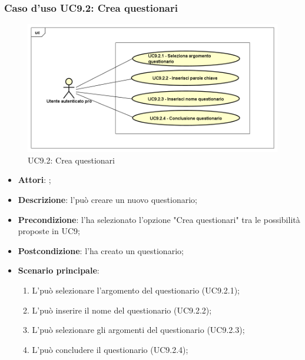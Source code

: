 	\subsubsection{Caso d'uso UC9.2: Crea questionari}
	\label{UC9.2}
	\begin{figure}[h]
		\centering
	\includegraphics[scale=0.5,keepaspectratio]{UML/UC9_2.png}
		\caption{UC9.2: Crea questionari}
	\end{figure}
	\FloatBarrier
	\begin{itemize}
		\item \textbf{Attori}: \uaupro;
		\item \textbf{Descrizione}: l'\uaupro può creare un nuovo questionario; 
		\item \textbf{Precondizione}: l'\uaupro ha selezionato l'opzione "Crea questionari" tra le possibilità proposte in UC9;
		\item \textbf{Postcondizione}: l'\uaupro ha creato un questionario;
		\item \textbf{Scenario principale}:
			\begin{enumerate}
				\item L'\uaupro può selezionare l'argomento del questionario (UC9.2.1);
				\item L'\uaupro può inserire il nome del questionario (UC9.2.2);
				\item L'\uaupro può selezionare gli argomenti del questionario (UC9.2.3);
				\item L'\uaupro può concludere il questionario (UC9.2.4);
			\end{enumerate}
		\end{itemize}
	
